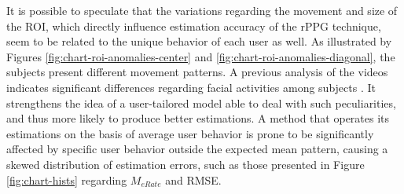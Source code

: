 It is possible to speculate that the variations regarding the movement and size of the ROI, which directly influence estimation accuracy of the rPPG technique, seem to be related to the unique behavior of each user as well. As illustrated by Figures \ref{fig:chart-roi-anomalies-center} and \ref{fig:chart-roi-anomalies-diagonal}, the subjects present different movement patterns. A previous analysis of the videos indicates significant differences regarding facial activities among subjects \parencite{bevilacqua2016variations}. It strengthens the idea of a user-tailored model able to deal with such peculiarities, and thus more likely to produce better estimations. A method that operates its estimations on the basis of average user behavior is prone to be significantly affected by specific user behavior outside the expected mean pattern, causing a skewed distribution of estimation errors, such as those presented in Figure \ref{fig:chart-hists} regarding $M_{eRate}$ and RMSE.



